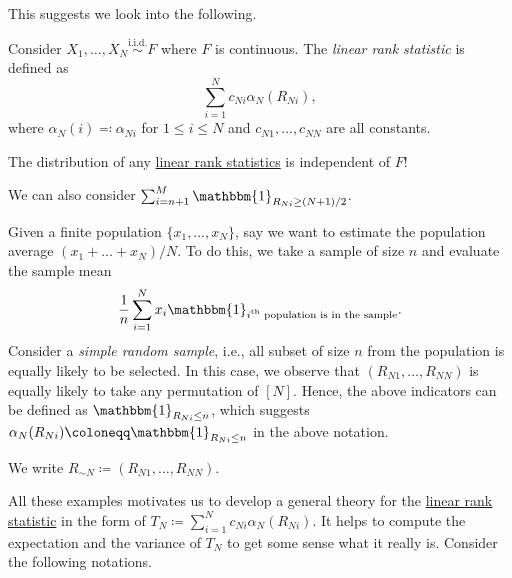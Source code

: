 This suggests we look into the following.

\begin{definition}\label{def:linrea-rank-statistic}
	Consider \(X_1, \dots , X_N \overset{\text{i.i.d.} }{\sim } F\) where \(F\) is continuous. The \emph{linear rank statistic} is defined as
	\[
		\sum_{i=1}^{N} c_{Ni} \alpha _N(R_{Ni}),
	\]
	where \(\alpha _N(i) \eqqcolon \alpha _{Ni}\) for \(1 \leq i \leq N\) and \(c_{N1}, \dots , c_{NN}\) are all constants.
\end{definition}

\begin{remark}
	The distribution of any \hyperref[def:linrea-rank-statistic]{linear rank statistics} is independent of \(F\)!
\end{remark}

\begin{eg}
	We can also consider \(\sum_{i=n+1}^{M} \mathbbm{1}_{R_{Ni} \geq (N+1) / 2}\).
\end{eg}

\begin{eg}
	Given a finite population \(\{ x_1, \dots , x_N \} \), say we want to estimate the population average \((x_1 + \dots + x_N) / N\). To do this, we take a sample of size \(n\) and evaluate the sample mean
	\[
		\frac{1}{n} \sum_{i=1}^{N} x_i \mathbbm{1}_{\text{\(i^{\text{th} }\) population is in the sample} } .
	\]
	Consider a \emph{simple random sample}, i.e., all subset of size \(n\) from the population is equally likely to be selected. In this case, we observe that \((R_{N1}, \dots , R_{NN})\)  is equally likely to take any permutation of \([N]\). Hence, the above indicators can be defined as \(\mathbbm{1}_{R_{Ni} \leq n} \), which suggests \(\alpha _N(R_{Ni}) \coloneqq \mathbbm{1}_{R_{Ni} \leq n} \) in the above notation.
\end{eg}

\begin{notation}
	We write \(R_{\sim N} \coloneqq (R_{N1}, \dots , R_{NN})\).
\end{notation}

All these examples motivates us to develop a general theory for the \hyperref[def:linrea-rank-statistic]{linear rank statistic} in the form of \(T_N \coloneqq \sum_{i=1}^{N} c_{Ni} \alpha _N(R_{Ni})\). It helps to compute the expectation and the variance of \(T_N\) to get some sense what it really is. Consider the following notations.


